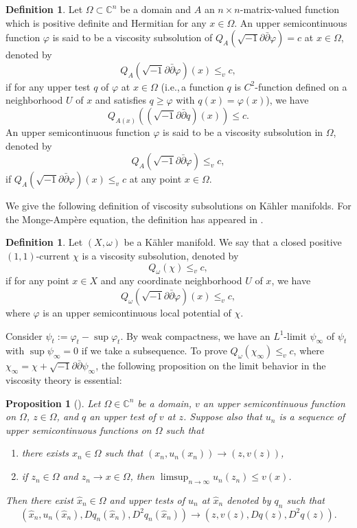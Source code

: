 \documentclass{amsart}
\numberwithin{equation}{section}
\theoremstyle{plain}
\newtheorem{prop}[equation]{Proposition}
\theoremstyle{definition}
\newtheorem{defn}[equation]{Definition}
\theoremstyle{remark}
\newcommand{\delb}{\sqrt{-1}\partial\bar{\partial}}
\begin{document}
\begin{defn}
    Let $\Omega \subset \mathbb{C}^n$ be a domain and $A$ an $n\times n$-matrix-valued function which is positive definite and Hermitian for any $x\in\Omega$. An upper semicontinuous function $\varphi$ is said to be a viscosity subsolution of $Q_{A}(\delb \varphi) = c$ at $x \in \Omega$, denoted by 
    $$Q_{A}(\delb\varphi)(x)\le_v c,$$ 
    if for any upper test $q$ of $\varphi$ at $x \in \Omega$ (i.e.,\,a function $q$ is $C^2$-function defined on a neighborhood $U$ of $x$ and satisfies $q\ge\varphi$ with $q(x)=\varphi(x)$), we have $$Q_{A(x)}\left((\delb q)(x)\right) \le c.$$
    An upper semicontinuous function $\varphi$ is said to be a viscosity subsolution in $\Omega$, denoted by
    $$Q_{A}(\delb \varphi) \le_v c,$$
    if $Q_A(\delb \varphi) (x)\le_v c$ at any point $x \in\Omega$.
\end{defn}

We give the following definition of viscosity subsolutions on K{\"a}hler manifolds. For the Monge-Amp{\`e}re equation, the definition has appeared in \cite{EGZ}.
\begin{defn}\label{defnvsub}
    Let $(X,\omega)$ be a K{\"a}hler manifold. We say that a closed positive $(1,1)$-current $\chi$ is a viscosity subsolution, denoted by
    $$Q_\omega(\chi) \le_v c,$$
    if for any point $x \in X$ and any coordinate neighborhood $U$ of $x$, we have $$Q_\omega(\delb\varphi)(x) \le_v c,$$
    where $\varphi$ is an upper semicontinuous local potential of $\chi$.
\end{defn}

Consider $\psi_t := \varphi_t - \sup{\varphi_t}$. By weak compactness, we have an $L^1$-limit $\psi_\infty$ of $\psi_t$ with $\sup{\psi_\infty}=0$ if we take a subsequence. To prove $Q_\omega(\chi_\infty)\le_v c$, where $\chi_\infty=\chi+\delb\psi_\infty$, the following proposition on the limit behavior in the viscosity theory is essential:

\begin{prop}[{\cite[Proposition 4.3]{CIL}}]\label{propCIL}
    Let $\Omega \in \mathbb{C}^n$ be a domain, $v$ an upper semicontinuous function on $\Omega$, $z \in \Omega$, and $q$ an upper test of $v$ at $z$. Suppose also that $u_n$ is a sequence of upper semicontinuous functions on $\Omega$ such that
    \begin{enumerate}[label={\upshape(\roman*)}]
        \item\label{itemCIL1} there exists $x_n \in \Omega$ such that $(x_n,u_n(x_n)) \rightarrow (z,v(z))$,
        \item\label{itemCIL2} if $z_n \in \Omega$ and $z_n \rightarrow x\in\Omega$, then $\limsup_{n\rightarrow\infty}u_n(z_n)\le v(x)$.
    \end{enumerate}
    Then there exist $\hat{x}_n\in \Omega$ and upper tests of $u_n$ at $\hat{x}_n$ denoted by $q_n$ such that
    $$(\hat{x}_n,u_n(\hat{x}_n),Dq_n(\hat{x}_n),D^2q_n(\hat{x}_n))\rightarrow(z,v(z),Dq(z),D^2q(z)).$$
\end{prop}
\end{document}
